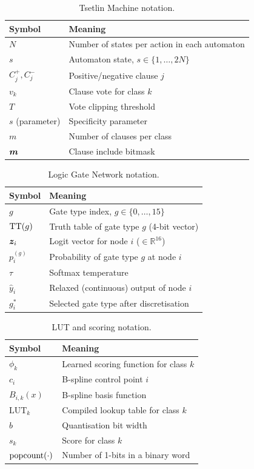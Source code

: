 \begin{table}[htbp]
\centering
\caption{Tsetlin Machine notation.}
\begin{tabular}{@{}ll@{}}
  \toprule
  \textbf{Symbol} & \textbf{Meaning} \\
  \midrule
  $N$ & Number of states per action in each automaton \\
  $s$ & Automaton state, $s \in \{1, \ldots, 2N\}$ \\
  $C_j^+, C_j^-$ & Positive/negative clause $j$ \\
  $v_k$ & Clause vote for class $k$ \\
  $T$ & Vote clipping threshold \\
  $s$ (parameter) & Specificity parameter \\
  $m$ & Number of clauses per class \\
  $\bm{m}$ & Clause include bitmask \\
  \bottomrule
\end{tabular}
\end{table}

\begin{table}[htbp]
\centering
\caption{Logic Gate Network notation.}
\begin{tabular}{@{}ll@{}}
  \toprule
  \textbf{Symbol} & \textbf{Meaning} \\
  \midrule
  $g$ & Gate type index, $g \in \{0, \ldots, 15\}$ \\
  $\operatorname{TT}(g)$ & Truth table of gate type $g$ (4-bit vector) \\
  $\bm{z}_i$ & Logit vector for node $i$ ($\in \mathbb{R}^{16}$) \\
  $p_i^{(g)}$ & Probability of gate type $g$ at node $i$ \\
  $\tau$ & Softmax temperature \\
  $\hat{y}_i$ & Relaxed (continuous) output of node $i$ \\
  $g_i^*$ & Selected gate type after discretisation \\
  \bottomrule
\end{tabular}
\end{table}

\begin{table}[htbp]
\centering
\caption{LUT and scoring notation.}
\begin{tabular}{@{}ll@{}}
  \toprule
  \textbf{Symbol} & \textbf{Meaning} \\
  \midrule
  $\phi_k$ & Learned scoring function for class $k$ \\
  $c_i$ & B-spline control point $i$ \\
  $B_{i,k}(x)$ & B-spline basis function \\
  $\text{LUT}_k$ & Compiled lookup table for class $k$ \\
  $b$ & Quantisation bit width \\
  $s_k$ & Score for class $k$ \\
  $\operatorname{popcount}(\cdot)$ & Number of 1-bits in a binary word \\
  \bottomrule
\end{tabular}
\end{table}
